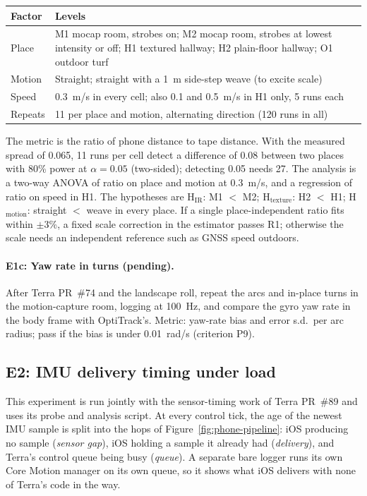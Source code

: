 \begin{center}
\small
\begin{tabularx}{\textwidth}{@{}l X@{}}
\toprule
Factor & Levels \\
\midrule
Place & M1 mocap room, strobes on; M2 mocap room, strobes at lowest intensity or off; H1 textured hallway; H2 plain-floor hallway; O1 outdoor turf \\
Motion & Straight; straight with a 1~m side-step weave (to excite scale) \\
Speed & 0.3~m/s in every cell; also 0.1 and 0.5~m/s in H1 only, 5 runs each \\
Repeats & 11 per place and motion, alternating direction (120 runs in all) \\
\bottomrule
\end{tabularx}
\end{center}

The metric is the ratio of phone distance to tape distance.
With the measured spread of 0.065, 11 runs per cell detect a difference of 0.08 between two places with 80\% power at $\alpha = 0.05$ (two-sided); detecting 0.05 needs 27.
The analysis is a two-way ANOVA of ratio on place and motion at 0.3~m/s, and a regression of ratio on speed in H1.
The hypotheses are H$_{\text{IR}}$: M1 $<$ M2; H$_{\text{texture}}$: H2 $<$ H1; H$_{\text{motion}}$: straight $<$ weave in every place.
If a single place-independent ratio fits within $\pm$3\%, a fixed scale correction in the estimator passes R1; otherwise the scale needs an independent reference such as GNSS speed outdoors.

\paragraph{E1c: Yaw rate in turns (pending).}
After Terra PR~\#74 and the landscape roll, repeat the arcs and in-place turns in the motion-capture room, logging at 100~Hz, and compare the gyro yaw rate in the body frame with OptiTrack's.
Metric: yaw-rate bias and error s.d.\ per arc radius; pass if the bias is under 0.01~rad/s (criterion P9).

\subsection{E2: IMU delivery timing under load}
\label{sec:phone-e2}

This experiment is run jointly with the sensor-timing work of Terra PR~\#89 and uses its probe and analysis script.
At every control tick, the age of the newest IMU sample is split into the hops of Figure~\ref{fig:phone-pipeline}: iOS producing no sample (\emph{sensor gap}), iOS holding a sample it already had (\emph{delivery}), and Terra's control queue being busy (\emph{queue}).
A separate bare logger runs its own Core Motion manager on its own queue, so it shows what iOS delivers with none of Terra's code in the way.

